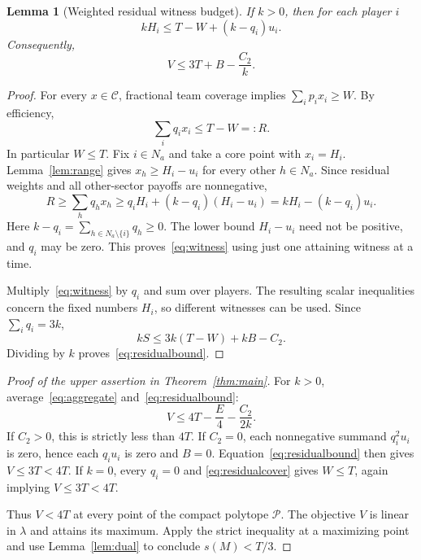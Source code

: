 \documentclass[11pt]{article}
\newtheorem{lemma}[theorem]{Lemma}
\theoremstyle{remark}
\newcommand{\core}{\mathcal C}
\newcommand{\pack}{\mathcal P}
\begin{document}
\begin{lemma}[Weighted residual witness budget]\label{lem:residual}
If $k>0$, then for each player $i$
\begin{equation}\label{eq:witness}
                       kH_i\le T-W+(k-q_i)u_i.
\end{equation}
Consequently,
\begin{equation}\label{eq:residualbound}
                         V\le3T+B-\frac{C_2}{k}.
\end{equation}
\end{lemma}
\begin{proof}
For every $x\in\core$, fractional team coverage implies
$\sum_ip_ix_i\ge W$. By efficiency,
\begin{equation}\label{eq:residualcover}
                       \sum_iq_ix_i\le T-W=:R.
\end{equation}
In particular $W\le T$. Fix $i\in N_a$ and take a core point with
$x_i=H_i$. Lemma~\ref{lem:range} gives $x_h\ge H_i-u_i$ for every
other $h\in N_a$. Since residual weights and all other-sector payoffs
are nonnegative,
\[
 R\ge\sum_hq_hx_h\ge q_iH_i+(k-q_i)(H_i-u_i)
                         =kH_i-(k-q_i)u_i.
\]
Here $k-q_i=\sum_{h\in N_a\setminus\{i\}}q_h\ge0$. The lower bound
$H_i-u_i$ need not be positive, and $q_i$ may be zero.
This proves~\eqref{eq:witness} using just one attaining witness at a time.

Multiply~\eqref{eq:witness} by $q_i$ and sum over players. The resulting
scalar inequalities concern the fixed numbers $H_i$, so different witnesses
can be used. Since $\sum_iq_i=3k$,
\[
                 kS\le3k(T-W)+kB-C_2.
\]
Dividing by $k$ proves~\eqref{eq:residualbound}.
\end{proof}

\begin{proof}[Proof of the upper assertion in Theorem~\ref{thm:main}]
For $k>0$, average~\eqref{eq:aggregate} and~\eqref{eq:residualbound}:
\begin{equation}\label{eq:strictbound}
                        V\le4T-\frac E4-\frac{C_2}{2k}.
\end{equation}
If $C_2>0$, this is strictly less than $4T$. If $C_2=0$, each
nonnegative summand $q_i^2u_i$ is zero, hence each $q_iu_i$ is zero
and $B=0$. Equation~\eqref{eq:residualbound} then gives
$V\le3T<4T$. If $k=0$, every $q_i=0$ and
\eqref{eq:residualcover} gives $W\le T$, again implying $V\le3T<4T$.

Thus $V<4T$ at every point of the compact polytope $\pack$.
The objective $V$ is linear in $\lambda$ and attains its maximum.
Apply the strict inequality at a maximizing point and use
Lemma~\ref{lem:dual} to conclude $s(M)<T/3$.
\end{proof}
\end{document}
